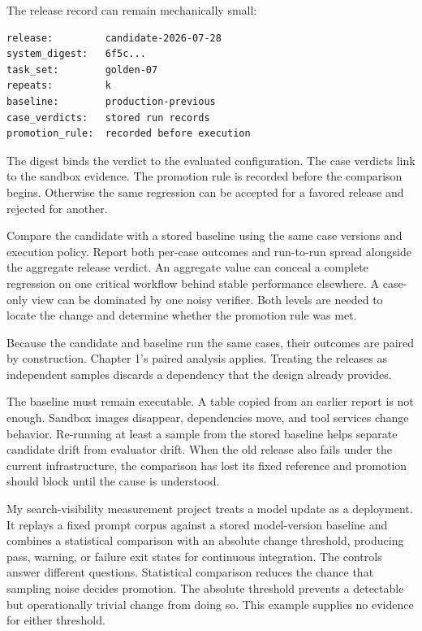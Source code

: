 The release record can remain mechanically small:

\begin{verbatim}
release:         candidate-2026-07-28
system_digest:   6f5c...
task_set:        golden-07
repeats:         k
baseline:        production-previous
case_verdicts:   stored run records
promotion_rule:  recorded before execution
\end{verbatim}

The digest binds the verdict to the evaluated configuration. The case verdicts link to the sandbox evidence. The promotion rule is recorded before the comparison begins. Otherwise the same regression can be accepted for a favored release and rejected for another.

Compare the candidate with a stored baseline using the same case versions and execution policy. Report both per-case outcomes and run-to-run spread alongside the aggregate release verdict. An aggregate value can conceal a complete regression on one critical workflow behind stable performance elsewhere. A case-only view can be dominated by one noisy verifier. Both levels are needed to locate the change and determine whether the promotion rule was met.

Because the candidate and baseline run the same cases, their outcomes are paired by construction. Chapter 1's paired analysis applies. Treating the releases as independent samples discards a dependency that the design already provides.

The baseline must remain executable. A table copied from an earlier report is not enough. Sandbox images disappear, dependencies move, and tool services change behavior. Re-running at least a sample from the stored baseline helps separate candidate drift from evaluator drift. When the old release also fails under the current infrastructure, the comparison has lost its fixed reference and promotion should block until the cause is understood.

My search-visibility measurement project treats a model update as a deployment. It replays a fixed prompt corpus against a stored model-version baseline and combines a statistical comparison with an absolute change threshold, producing pass, warning, or failure exit states for continuous integration. The controls answer different questions. Statistical comparison reduces the chance that sampling noise decides promotion. The absolute threshold prevents a detectable but operationally trivial change from doing so. This example supplies no evidence for either threshold.

